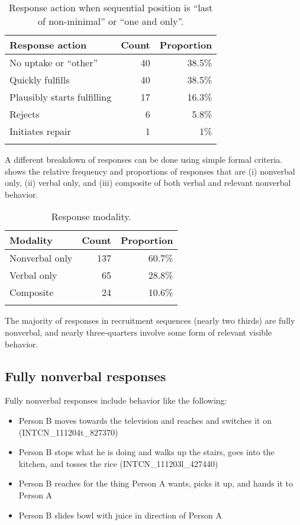 \documentclass[output=paper]{langsci/langscibook}
\begin{document}
\begin{table}
\begin{tabularx}{0.75\textwidth}{Xrr}
\lsptoprule
Response action & Count & Proportion\\
\midrule
No uptake or “other” & 40 & 38.5\%\\
Quickly fulfills & 40 & 38.5\%\\
Plausibly starts fulfilling & 17 & 16.3\%\\
Rejects & 6 & 5.8\%\\
Initiates repair & 1 & 1\%\\
\lspbottomrule
\end{tabularx}
\caption{Response action when sequential position is “last of non-minimal” or “one and only”.}
\label{tab:enfield:7}
\end{table}

A different breakdown of responses can be done using simple formal criteria.  shows the relative frequency and proportions of responses that are (i) nonverbal only, (ii) verbal only, and (iii) composite of both verbal and relevant nonverbal behavior.

\begin{table}
\begin{tabularx}{0.66\textwidth}{Xrr}
\lsptoprule
Modality & Count & Proportion\\
\midrule
Nonverbal only & 137 & 60.7\%\\
Verbal only & 65 & 28.8\%\\
Composite & 24 & 10.6\%\\
\lspbottomrule
\end{tabularx}
\caption{Response modality.}
\label{tab:enfield:8}
\end{table}

The majority of responses in recruitment sequences (nearly two thirds) are fully nonverbal, and nearly three-quarters involve some form of relevant visible behavior.

\subsection{Fully nonverbal responses}

Fully nonverbal responses include behavior like the following:

\begin{itemize}
\item
Person B moves towards the television and reaches and switches it on (INTCN\_111204t\_827370) %
\item
Person B stops what he is doing and walks up the stairs, goes into the kitchen, and tosses the rice (INTCN\_111203l\_427440)
\item
Person B reaches for the thing Person A wants, picks it up, and hands it to Person A  %
\item
Person B slides bowl with juice in direction of Person A  %
\end{itemize}
\end{document}
